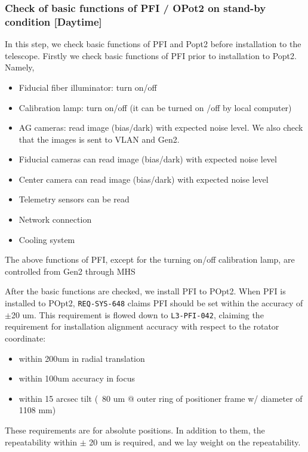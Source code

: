 \subsubsection{Check of basic functions of PFI / OPot2 on stand-by condition [Daytime]}\label{secflow:PFIoff}
In this step, we check basic functions of PFI and Popt2 before installation to the telescope.
Firstly we check basic functions of PFI prior to installation to Popt2.
Namely,
\begin{itemize}
\item Fiducial fiber illuminator: turn on/off
\item Calibration lamp: turn on/off (it can be turned on /off by local computer)
\item AG cameras: read image (bias/dark) with expected noise level.
We also check that the images is sent to VLAN and Gen2.
\item Fiducial cameras can read image (bias/dark) with expected noise level
\item Center camera can read image (bias/dark) with expected noise level
\item Telemetry sensors can be read
\item Network connection
\item Cooling system
\end{itemize}
The above functions of PFI, except for the turning on/off calibration lamp, are controlled from Gen2 through MHS

After the basic functions are checked, we install PFI to POpt2.
When PFI is installed to POpt2, {\tt REQ-SYS-648} claims PFI should be set within the accuracy of $\pm$20 um.
This requirement is flowed down to {\tt L3-PFI-042}, claiming the requirement for installation alignment accuracy with respect to the rotator coordinate:
\begin{itemize}
\item within 200um in radial translation
\item  within 100um accuracy in focus
\item  within 15 arcsec tilt (~80 um @ outer ring of positioner frame w/ diameter of 1108 mm)
\end{itemize}
These requirements are for absolute positions.
In addition to them, the repeatability within $\pm$ 20 um is required, and we lay weight on the repeatability.

